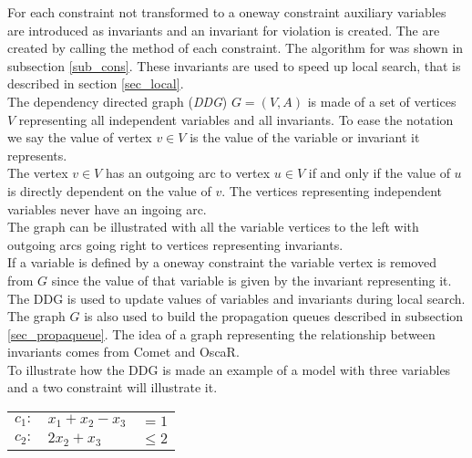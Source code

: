 For each constraint not transformed to a oneway constraint auxiliary variables are introduced as invariants and an 
invariant for violation is created. The are created by calling the method  of each constraint. 
The algorithm for  was shown in subsection \ref{sub_cons}. These invariants are used to speed up local 
search, that is described in section \ref{sec_local}.  \\
The dependency directed graph (\emph{DDG}) $G=(V,A)$ is made of a set of vertices $V$ representing all independent 
variables and all invariants. To ease the notation we say the value of vertex $v \in V$ is the value of the variable or 
invariant it represents. \\
The vertex $v \in V$ has an outgoing arc to vertex $u \in V$ if and only if the value of $u$ is directly dependent on 
the value of $v$. The vertices representing independent variables never have an ingoing arc. \\ 
The graph can be illustrated with all the variable vertices to the left with outgoing arcs going right to vertices 
representing invariants. \\  
If a variable is defined by a oneway constraint the variable vertex is removed from $G$ since the value of that 
variable is given by the invariant representing it. \\  
The DDG is used to update values of variables and invariants during local search. The graph $G$ is also used to build 
the propagation queues described in subsection \ref{sec_propaqueue}. The idea of a graph representing the relationship 
between invariants comes from Comet \cite[p. 97]{comet} and OscaR\cite[p. 7-9]{oscar}. \\
To illustrate how the DDG is made an example of a model with three variables and a two constraint will 
illustrate it. \\ 
\begin{center}
\begin{tabular}{rlr}
$ c_1: $&$x_1 + x_2 - x_3 $&$= 1$ \\
$ c_2: $&$2x_2 + x_3 $&$\leq 2$ \\
\end{tabular} 
\end{center}
